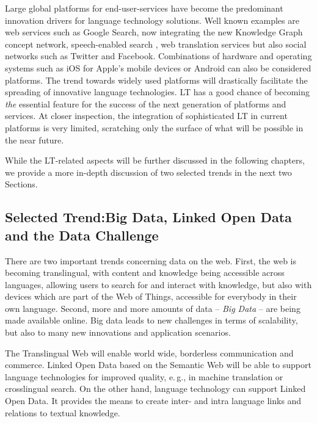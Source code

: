 \documentclass[10pt, plain]{../../metanetpaper}
\begin{document}
\begin{multicols}{2}
Large global platforms for end-user-services have become the predominant innovation drivers for language technology solutions. Well known examples are web services such as Google Search, now integrating the new Knowledge Graph concept network, speech-enabled search \cite{meisel12}, web translation services but also social networks such as Twitter and Facebook. Combinations of hardware and operating systems such as iOS for Apple's mobile devices or Android can also be considered platforms. The trend towards widely used platforms will drastically facilitate the spreading of innovative language technologies. LT has a good chance of becoming \emph{the} essential feature for the success of the next generation of platforms and services. At closer inspection, the integration of sophisticated LT in current platforms is very limited, scratching only the surface of what will be possible in the near future.

While the LT-related aspects will be further discussed in the following chapters, we provide a more in-depth discussion of two selected trends in the next two Sections.

\subsection[Selected Trend: Big Data, Linked Open Data and the Data Challenge]{Selected Trend:\newline Big Data, Linked Open Data and the Data Challenge}
\label{sec:linked-data-open}

There are two important trends concerning data on the web. First, the web is becoming translingual, with content and knowledge being accessible across languages, allowing users to search for and interact with knowledge, but also with devices which are part of the Web of Things, accessible for everybody in their own language. Second, more and more amounts of data -- \emph{Big Data} -- are being made available online. Big data leads to new challenges in terms of scalability, but also to many new innovations and application scenarios. 

The Translingual Web will enable world wide, borderless communication and commerce. Linked Open Data based on the Semantic Web will be able to support language technologies for improved quality, e.\,g., in machine translation or crosslingual search. On the other hand, language technology can support Linked Open Data. It provides the means to create inter- and intra language links and relations to textual knowledge.


\end{multicols}
\end{document}

